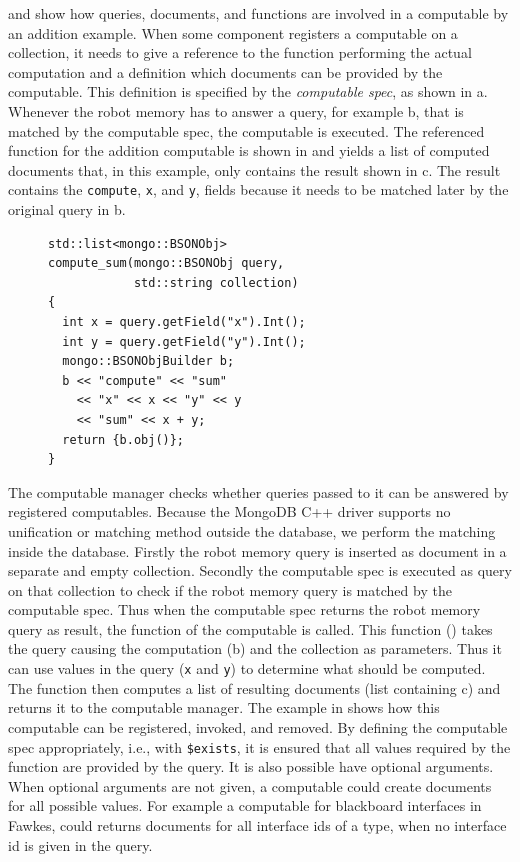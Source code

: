  and  show how queries,
documents, and functions are involved in a computable by an addition example.
When some component registers a computable
on a collection, it needs to give a reference to the function
performing the actual computation and a definition which documents can
be provided by the computable. This definition is specified by the
\emph{computable spec}, as shown in a. Whenever the
robot memory has to answer a query, for example b, that is
matched by the computable spec, the computable is executed. The
referenced function for the addition computable is shown in
 and yields a list of computed documents that,
in this example, only contains the result shown in
c. The result contains the \texttt{compute},
\texttt{x}, and \texttt{y}, fields because it needs to be matched
later by the original query in b.
\begin{figure}
  \vspace{-0.0cm}
\begin{lstlisting}[style=SmallCpp,
  caption={Function of a computable},
  label=lst:comp-func,
  framexleftmargin=5pt, xleftmargin=0pt,
 morekeywords={}, numbers=none]
std::list<mongo::BSONObj>
compute_sum(mongo::BSONObj query,
            std::string collection)
{
  int x = query.getField("x").Int();
  int y = query.getField("y").Int();
  mongo::BSONObjBuilder b;
  b << "compute" << "sum"
    << "x" << x << "y" << y
    << "sum" << x + y;
  return {b.obj()};
}
\end{lstlisting}
\vspace{-8mm}
\end{figure}

The computable manager checks whether queries passed to it can be
answered by registered computables. Because the MongoDB C++ driver
supports no unification or matching method outside the database, we
perform the matching inside the database. Firstly the robot memory query is inserted
as document in a separate and empty collection. Secondly the
computable spec is executed as query on that collection to check if the robot memory query
is matched by the computable spec. Thus when the computable spec
returns the robot memory query as result, the function of the computable is called. This function
() takes the query causing the computation
(b) and the collection as parameters. Thus it can use
values in the query (\texttt{x} and \texttt{y}) to determine what
should be computed. The function then computes a list of resulting
documents (list containing c) and returns it to the
computable manager.
The example in  shows how this computable can be
registered, invoked, and removed.
By defining the computable spec appropriately,
i.e., with \texttt{\$exists}, it is ensured that all values required
by the function are provided by the query. It is also possible have
optional arguments. When optional arguments are not given, a
computable could create documents for all possible values. For example a computable for
blackboard interfaces in Fawkes, could returns documents for all interface
ids of a type, when no interface id is given in the query.

